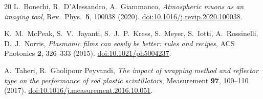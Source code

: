 \documentclass[11pt,a4paper]{article}
\begin{document}
\begin{thebibliography}{20}
L.~Bonechi, R.~D'Alessandro, A.~Giammanco,
\emph{Atmospheric muons as an imaging tool},
Rev.\ Phys.\ \textbf{5}, 100038 (2020).
\href{https://doi.org/10.1016/j.revip.2020.100038}{doi:10.1016/j.revip.2020.100038}.

K.~M.~McPeak, S.~V.~Jayanti, S.~J.~P.~Kress, S.~Meyer, S.~Iotti, A.~Rossinelli,
D.~J.~Norris,
\emph{Plasmonic films can easily be better: rules and recipes},
ACS Photonics \textbf{2}, 326--333 (2015).
\href{https://doi.org/10.1021/ph5004237}{doi:10.1021/ph5004237}.

A.~Taheri, R.~Gholipour Peyvandi,
\emph{The impact of wrapping method and reflector type on the performance of rod
plastic scintillators},
Measurement \textbf{97}, 100--110 (2017).
\href{https://doi.org/10.1016/j.measurement.2016.10.051}{doi:10.1016/j.measurement.2016.10.051}.

\end{thebibliography}
\end{document}
